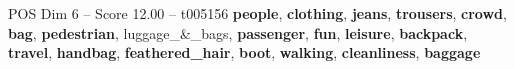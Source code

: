 \begin{textsample}{POS Dim 6 – Score 12.00 – t005156}  \label{ex:f6_pos_024}
\textbf{people}, \textbf{clothing}, \textbf{jeans}, \textbf{trousers}, \textbf{crowd}, \textbf{bag}, \textbf{pedestrian}, luggage\_\&\_bags, \textbf{passenger}, \textbf{fun}, \textbf{leisure}, \textbf{backpack}, \textbf{travel}, \textbf{handbag}, \textbf{feathered\_hair}, \textbf{boot}, \textbf{walking}, \textbf{cleanliness}, \textbf{baggage}

\end{textsample}
